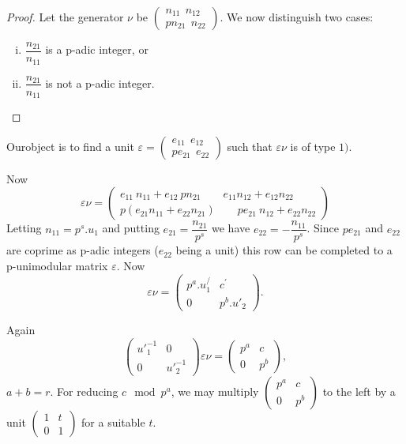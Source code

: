 \begin{proof}
  Let the generator $\nu$ be $\begin{pmatrix} n_{11} ~~ n_{12}
    \\ pn_{21}~~ n_{22} \end{pmatrix}$. We now distinguish two cases:  
  \begin{enumerate}[(i)]
  \item $\dfrac{n_{21}}{n_{11}}$ is a p-adic integer, or
  \item $\dfrac{n_{21}}{n_{11}}$ is not a p-adic integer.
  \end{enumerate}
\end{proof}

\begin{case}[(i) ]\label{chap4:sec9:thm1:case1}%
  Our\pageoriginale object is to find a unit $\varepsilon = \begin{pmatrix}
    e_{11}~~e_{12} \\ pe_{21} ~~ e_{22} \end{pmatrix}$ such that
  $\varepsilon \nu$ is of type $1)$. 
\end{case}

Now
$$
\varepsilon \nu = \begin{pmatrix} e_{11}~n_{11} + e_{12} ~ pn_{21}
  \qquad e_{11} n_{12} + e_{12} n_{22} \\ p(e_{21} n_{11} + e_{22}
  n_{21}) \qquad pe_{21} ~ n_{12}  + e_{22} n_{22} \end{pmatrix} 
$$
Letting $n_{11} = p^s. u_1$ and putting $e_{21} = \dfrac{n_{21}}{p^s}$
we have $e_{22} = - \dfrac{n_{11}}{p^s}$. Since $pe_{21}$ and $e_{22}$
are coprime as p-adic integers ($e_{22}$ being a unit) this row can be
completed to a p-unimodular matrix $\varepsilon$. Now 
$$
\varepsilon \nu = \begin{pmatrix} p^a.  u^/_1&  c^{'} \\ 0 & p^b.
  u'_2 \end{pmatrix}. 
$$

Again
$$
\begin{pmatrix} u'^{- 1}_1 &  0 \\ 0 &  u'^{-1}_2 \end{pmatrix}
\varepsilon \nu = \begin{pmatrix} p^a &  c \\ 0 &  p^b \end{pmatrix}, 
$$
$a + b = r$. For reducing $c \mod p^a$, we may multiply
$ \begin{pmatrix} p^a & c \\ 0 & p^b \end{pmatrix}$ to the left by a
unit $ \begin{pmatrix} 1 & t \\ 0 & 1 \end{pmatrix}$ for a suitable
$t$.
 
